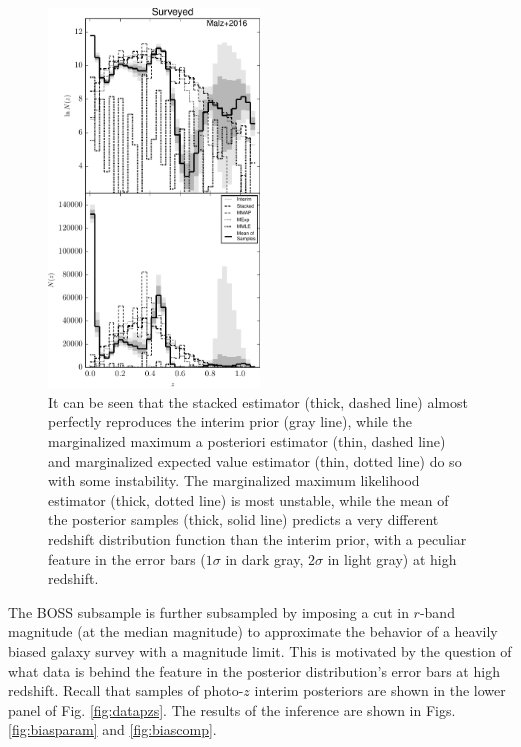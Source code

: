 \documentclass[preprint]{aastex}
\begin{document}
\begin{figure}
\includegraphics[width=0.5\textwidth]{figs/boss/comps.pdf}
\caption{It can be seen that the stacked estimator (thick, dashed line) almost 
perfectly reproduces the interim prior (gray line), while the marginalized 
maximum a posteriori estimator (thin, dashed line) and marginalized expected 
value estimator (thin, dotted line) do so with some instability.  The 
marginalized maximum likelihood estimator (thick, dotted line) is most 
unstable, while the mean of the posterior samples (thick, solid line) predicts 
a very different redshift distribution function than the interim prior, with a 
peculiar feature in the error bars ($1\sigma$ in dark gray, $2\sigma$ in light 
gray) at high redshift.}
\label{fig:datacomp}
\end{figure}

The BOSS subsample is further subsampled by imposing a cut in $r$-band 
magnitude (at the median magnitude) to approximate the behavior of a heavily 
biased galaxy survey with a magnitude limit.  This is motivated by the question 
of what data is behind the feature in the posterior distribution's error bars 
at high redshift.  Recall that samples of photo-$z$ interim posteriors are 
shown in the lower panel of Fig. \ref{fig:datapzs}.  The results of the 
inference are shown in Figs. \ref{fig:biasparam} and \ref{fig:biascomp}.  
\end{document}
